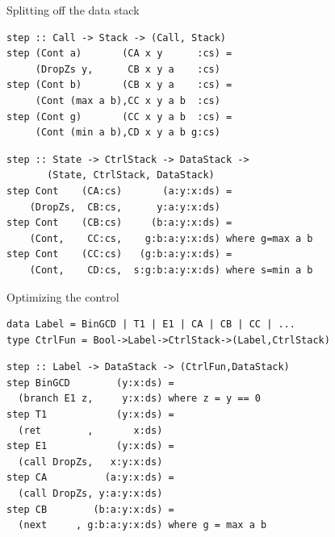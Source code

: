 \documentclass[pdf]{beamer}
\begin{document}
\begin{frame}[fragile]{Splitting off the data stack}
\begin{block}{}
\begin{verbatim}
step :: Call -> Stack -> (Call, Stack)
step (Cont a)       (CA x y      :cs) =
     (DropZs y,      CB x y a    :cs)
step (Cont b)       (CB x y a    :cs) =
     (Cont (max a b),CC x y a b  :cs)
step (Cont g)       (CC x y a b  :cs) =
     (Cont (min a b),CD x y a b g:cs)
\end{verbatim}
\end{block}
\begin{block}{}
\begin{verbatim}
step :: State -> CtrlStack -> DataStack ->
       (State, CtrlStack, DataStack)
step Cont    (CA:cs)       (a:y:x:ds) = 
    (DropZs,  CB:cs,      y:a:y:x:ds)
step Cont    (CB:cs)     (b:a:y:x:ds) = 
    (Cont,    CC:cs,    g:b:a:y:x:ds) where g=max a b
step Cont    (CC:cs)   (g:b:a:y:x:ds) = 
    (Cont,    CD:cs,  s:g:b:a:y:x:ds) where s=min a b
\end{verbatim}
\end{block}
\end{frame}

\begin{frame}[fragile]{Optimizing the control}
\begin{block}{}
\begin{small}
\begin{verbatim}
data Label = BinGCD | T1 | E1 | CA | CB | CC | ...
type CtrlFun = Bool->Label->CtrlStack->(Label,CtrlStack)
\end{verbatim}
\end{small}
\end{block}

\begin{block}{}
\begin{verbatim}
step :: Label -> DataStack -> (CtrlFun,DataStack)
step BinGCD        (y:x:ds) =
  (branch E1 z,     y:x:ds) where z = y == 0
step T1            (y:x:ds) = 
  (ret        ,       x:ds)
step E1            (y:x:ds) = 
  (call DropZs,   x:y:x:ds)
step CA          (a:y:x:ds) = 
  (call DropZs, y:a:y:x:ds)
step CB        (b:a:y:x:ds) = 
  (next     , g:b:a:y:x:ds) where g = max a b
\end{verbatim}
\end{block}

\end{frame}
\end{document}
